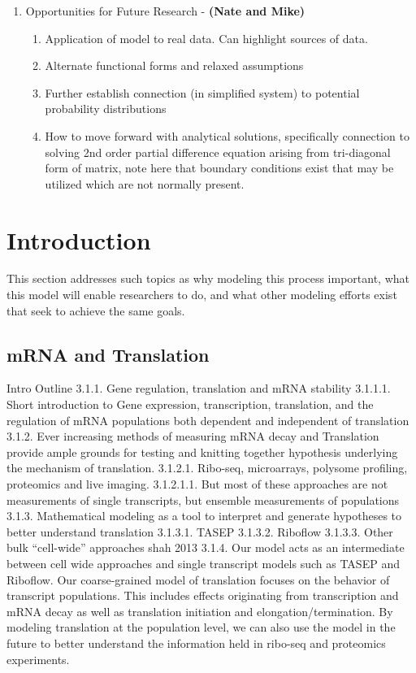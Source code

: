 \documentclass[review]{elsarticle}
\begin{document}
\begin{enumerate}
\begin{enumerate}
\end{enumerate}
\item Opportunities for Future Research  - \textbf{(Nate and Mike)}
\begin{enumerate}
\item Application of model to real data.
Can highlight sources of data.
\item Alternate functional forms and relaxed assumptions
\item Further establish connection (in simplified system) to potential probability distributions
\item How to move forward with analytical solutions, specifically connection to solving 2nd order partial difference equation arising from tri-diagonal form of matrix, note here that boundary conditions exist that may be utilized which are not normally present.
\end{enumerate}
\end{enumerate}
\newpage
\section{Introduction}
This section addresses such topics as why modeling this process important, what this model will enable researchers to do, and what other modeling efforts exist that seek to achieve the same goals.


\subsection{mRNA and Translation}\label{sec:Bioligical underpinnings}

Intro Outline
3.1.1.	 Gene regulation, translation and mRNA stability
3.1.1.1.	Short introduction to Gene expression, transcription, translation, and the regulation of mRNA populations both dependent and independent of translation
3.1.2.	 Ever increasing methods of measuring mRNA decay and Translation provide ample grounds for testing and knitting together hypothesis underlying the mechanism of translation.
3.1.2.1.	Ribo-seq, microarrays, polysome profiling, proteomics and live imaging. 
3.1.2.1.1.	But most of these approaches are not measurements of single transcripts, but ensemble measurements of populations
3.1.3.	 Mathematical modeling as a tool to interpret and generate hypotheses to better understand translation
3.1.3.1.	TASEP
3.1.3.2.	Riboflow
3.1.3.3.	Other bulk “cell-wide” approaches shah 2013
3.1.4.	 Our model acts as an intermediate between cell wide approaches and single transcript models such as TASEP and Riboflow. Our coarse-grained model of translation focuses on the behavior of transcript populations. This includes effects originating from transcription and mRNA decay as well as translation initiation and elongation/termination. By modeling translation at the population level, we can also use the model in the future to better understand the information held in ribo-seq and proteomics experiments. 
\end{document}
